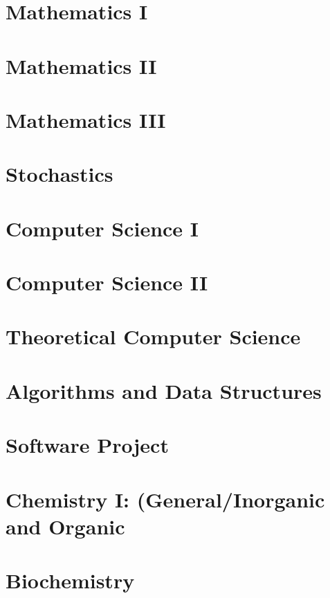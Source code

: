 \chapter{Mathematics I}


\chapter{Mathematics II}


\chapter{Mathematics III}


\chapter{Stochastics}


\chapter{Computer Science I}


\chapter{Computer Science II}


\chapter{Theoretical Computer Science}


\chapter{Algorithms and Data Structures}


\chapter{Software Project}


\chapter{Chemistry I: (General/Inorganic and Organic}


\chapter{Biochemistry}


